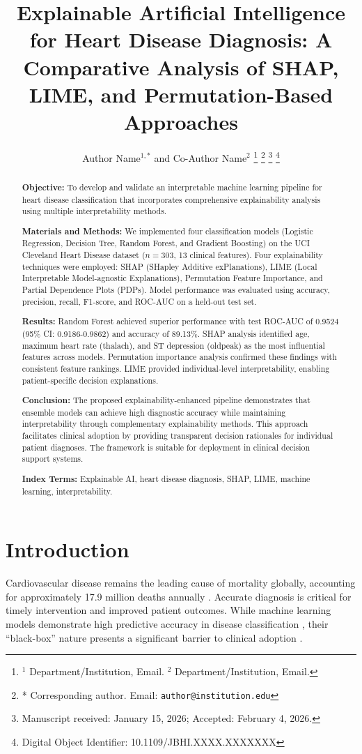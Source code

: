 \documentclass[journal]{IEEEtran}
\title{Explainable Artificial Intelligence for Heart Disease Diagnosis: A Comparative Analysis of SHAP, LIME, and Permutation-Based Approaches}
\author{Author Name$^{1,*}$ and Co-Author Name$^{2}$%
\thanks{$^{1}$ Department/Institution, Email. $^{2}$ Department/Institution, Email.}
\thanks{* Corresponding author. Email: \texttt{author@institution.edu}}
\thanks{Manuscript received: January 15, 2026; Accepted: February 4, 2026.}
\thanks{Digital Object Identifier: 10.1109/JBHI.XXXX.XXXXXXX}}
\begin{document}
\maketitle

\begin{abstract}
\textbf{Objective:} To develop and validate an interpretable machine learning pipeline for heart disease classification that incorporates comprehensive explainability analysis using multiple interpretability methods.

\textbf{Materials and Methods:} We implemented four classification models (Logistic Regression, Decision Tree, Random Forest, and Gradient Boosting) on the UCI Cleveland Heart Disease dataset ($n=303$, 13 clinical features). Four explainability techniques were employed: SHAP (SHapley Additive exPlanations), LIME (Local Interpretable Model-agnostic Explanations), Permutation Feature Importance, and Partial Dependence Plots (PDPs). Model performance was evaluated using accuracy, precision, recall, F1-score, and ROC-AUC on a held-out test set.

\textbf{Results:} Random Forest achieved superior performance with test ROC-AUC of 0.9524 (95\% CI: 0.9186-0.9862) and accuracy of 89.13\%. SHAP analysis identified age, maximum heart rate (thalach), and ST depression (oldpeak) as the most influential features across models. Permutation importance analysis confirmed these findings with consistent feature rankings. LIME provided individual-level interpretability, enabling patient-specific decision explanations.

\textbf{Conclusion:} The proposed explainability-enhanced pipeline demonstrates that ensemble models can achieve high diagnostic accuracy while maintaining interpretability through complementary explainability methods. This approach facilitates clinical adoption by providing transparent decision rationales for individual patient diagnoses. The framework is suitable for deployment in clinical decision support systems.

\textbf{Index Terms:} Explainable AI, heart disease diagnosis, SHAP, LIME, machine learning, interpretability.
\end{abstract}

\section{Introduction}

Cardiovascular disease remains the leading cause of mortality globally, accounting for approximately 17.9 million deaths annually \cite{detrano1989international}. Accurate diagnosis is critical for timely intervention and improved patient outcomes. While machine learning models demonstrate high predictive accuracy in disease classification \cite{breiman2001random}, their ``black-box'' nature presents a significant barrier to clinical adoption \cite{caruana2015intelligible}.
\end{document}
